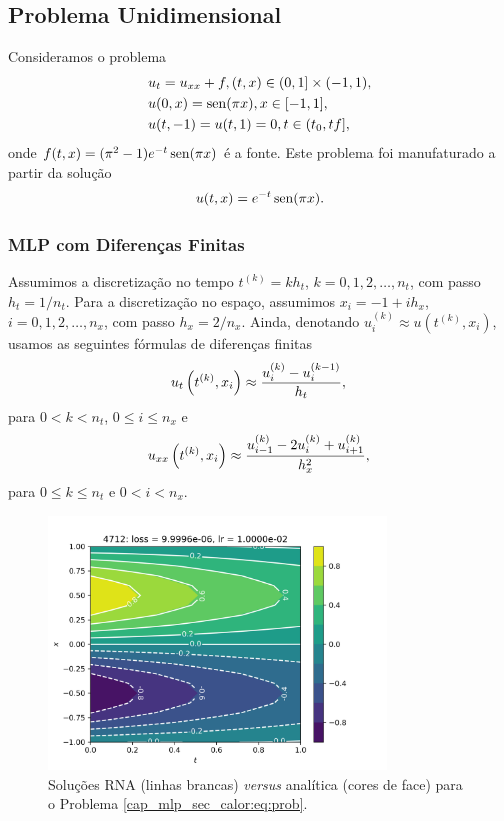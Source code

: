 \subsection{Problema Unidimensional}

Consideramos o problema
\begin{subequations}\label{cap_mlp_sec_calor:eq:prob}
  \begin{align}
    &u_t = u_{xx} + f, (t,x)\in (0, 1] \times (-1, 1),\\
    &u(0,x) = \operatorname{sen}(\pi x), x\in [-1, 1],\\
    &u(t,-1) = u(t,1) = 0, t\in (t_0, tf],
  \end{align}
\end{subequations}
onde $f(t,x) = (\pi^2 - 1)e^{-t}\operatorname{sen}(\pi x)$ é a fonte. Este problema foi manufaturado a partir da solução
\begin{equation}
  u(t,x) = e^{-t}\operatorname{sen}(\pi x).
\end{equation}

\subsubsection{MLP com Diferenças Finitas}

Assumimos a discretização no tempo $t^{(k)} = kh_t$, $k = 0, 1, 2, \dotsc, n_t$, com passo $h_t = 1/n_t$. Para a discretização no espaço, assumimos $x_{i} = -1 + ih_x$, $i = 0, 1, 2, \dotsc, n_x$, com passo $h_x = 2/n_x$. Ainda, denotando $u^{(k)}_i \approx u\left(t^{(k)}, x_i\right)$, usamos as seguintes fórmulas de diferenças finitas
\begin{equation}
  u_t\left(t^{(k)}, x_i\right) \approx \frac{u_i^{(k)} - u_i^{(k-1)}}{h_t},\\
\end{equation}
para $0<k<n_t$, $0\leq i\leq n_x$ e
\begin{equation}
  u_{xx}\left(t^{(k)}, x_i\right) \approx \frac{u_{i-1}^{(k)} - 2u_i^{(k)} + u_{i+1}^{(k)}}{h_x^2},\\
\end{equation}
para $0\leq k\leq n_t$ e $0 < i < n_x$.

\begin{figure}[H]
  \centering
  \includegraphics[width=0.8\textwidth]{./cap_mlp/dados/fig_mlp_calor/fig}
  \caption{Soluções RNA (linhas brancas) \textit{versus} analítica (cores de face) para o Problema \ref{cap_mlp_sec_calor:eq:prob}.}
  \label{cap_mlp_sec_calor:fig:rna_calor}
\end{figure}

